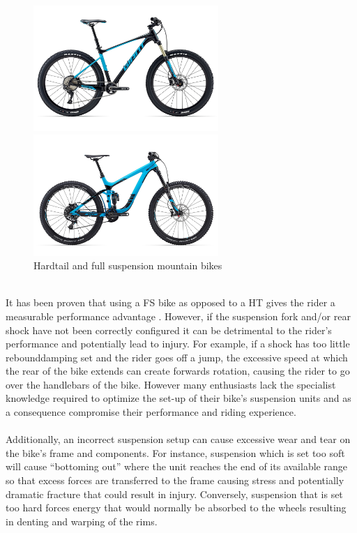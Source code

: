 	\begin{figure}[h!]
		\centering
		\begin{minipage}{0.45\textwidth}
			\centering
			\includegraphics[width=7cm]{../images/2017_GIANT_FATHOM_1.jpg}
		\end{minipage}\hfill
		\begin{minipage}{0.45\textwidth}
			\centering
			\includegraphics[width=7cm]{../images/2016_Giant_Reign_Advanced_275_0.jpg}
		\end{minipage}
		\caption{Hardtail and full suspension mountain bikes \citep{giantfathom,giantreign}}
		\label{fig:fsandht}
	\end{figure}
	\\
	It has been proven that using a FS bike as opposed to a HT gives the rider a measurable performance advantage \citep{fullsusperf}. However, if the suspension fork and/or rear shock have not been correctly configured it can be detrimental to the rider’s performance and potentially lead to injury. For example, if a \gls{shock} has too little \gls{rebounddamping} set and the rider goes off a jump, the excessive speed at which the	rear of the bike extends can create forwards rotation, causing the rider to go over the handlebars of the bike. However many enthusiasts lack the specialist knowledge required to optimize the set-up of their bike’s suspension units and as a consequence compromise their performance and riding experience.
	\\\\
	Additionally, an incorrect suspension setup can cause excessive wear and tear on the	bike’s frame and components. For instance, suspension which is set too soft will cause “bottoming out” where the unit reaches the end of its available range so that excess forces are transferred to the frame causing stress and potentially dramatic fracture that could result in injury. Conversely, suspension that is set too hard forces energy that would normally be absorbed to the wheels resulting in denting and warping of the rims.
